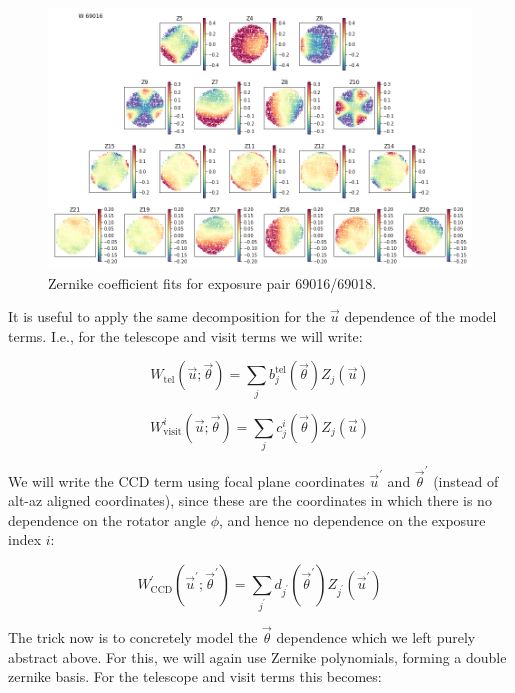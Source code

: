 \documentclass{article}
\begin{document}
\begin{figure}
    \includegraphics[width=\textwidth]{a69016.png}

    \caption{Zernike coefficient fits for exposure pair 69016/69018.}

    \label{fig:a69016}
\end{figure}

It is useful to apply the same decomposition for the $\vec{u}$ dependence of the
model terms.  I.e., for the telescope and visit terms we will write:

\begin{equation}
    W_\mathrm{tel}\left(\vec{u}; \vec{\theta}\right) =
    \sum_j b^\mathrm{tel}_j (\vec{\theta}) Z_j(\vec{u})
\end{equation}

\begin{equation}
    W^i_\mathrm{visit}\left(\vec{u}; \vec{\theta}\right) =
    \sum_j c^i_j (\vec{\theta}) Z_j(\vec{u})
\end{equation}

We will write the CCD term using focal plane coordinates $\vec{u}^\prime$ and
$\vec{\theta}^\prime$ (instead of alt-az aligned coordinates), since these are
the coordinates in which there is no dependence on the rotator angle $\phi$, and
hence no dependence on the exposure index $i$:

\begin{equation}
    W^\prime_\mathrm{CCD}\left(\vec{u}^\prime; \vec{\theta}^\prime\right) =
    \sum_{j^\prime} d_{j^\prime} (\vec{\theta}^\prime) Z_{j^\prime}(\vec{u}^\prime)
\end{equation}

The trick now is to concretely model the $\vec{\theta}$ dependence which we left
purely abstract above.  For this, we will again use Zernike polynomials, forming
a double zernike basis.  For the telescope and visit terms this becomes:
\end{document}
